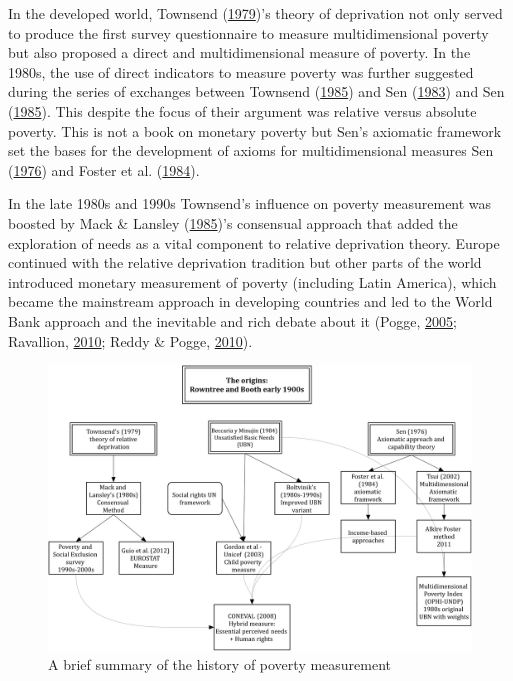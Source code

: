 \documentclass[]{book}
\begin{document}
In the developed world, Townsend (\protect\hyperlink{ref-Townsend1979}{1979})'s theory of deprivation not only served to produce the first survey questionnaire to measure multidimensional poverty but also proposed a direct and multidimensional measure of poverty. In the 1980s, the use of direct indicators to measure poverty was further suggested during the series of exchanges between Townsend (\protect\hyperlink{ref-Townsend1985}{1985}) and Sen (\protect\hyperlink{ref-Sen1983}{1983}) and Sen (\protect\hyperlink{ref-Sen1985}{1985}). This despite the focus of their argument was relative versus absolute poverty. This is not a book on monetary poverty but Sen's axiomatic framework set the bases for the development of axioms for multidimensional measures Sen (\protect\hyperlink{ref-Sen1976}{1976}) and Foster et al. (\protect\hyperlink{ref-Foster1984}{1984}).

In the late 1980s and 1990s Townsend's influence on poverty measurement was boosted by Mack \& Lansley (\protect\hyperlink{ref-Mack1985}{1985})'s consensual approach that added the exploration of needs as a vital component to relative deprivation theory. Europe continued with the relative deprivation tradition but other parts of the world introduced monetary measurement of poverty (including Latin America), which became the mainstream approach in developing countries and led to the World Bank approach and the inevitable and rich debate about it (Pogge, \protect\hyperlink{ref-Pogge2005a}{2005}; Ravallion, \protect\hyperlink{ref-Ravallion2010}{2010}; Reddy \& Pogge, \protect\hyperlink{ref-Reddy2010}{2010}).

\begin{figure}[H]

{\centering \includegraphics[width=\textwidth]{history_MPM} 

}

\caption{A brief summary of the history of poverty measurement}\label{fig:histMPM}
\end{figure}
\end{document}
